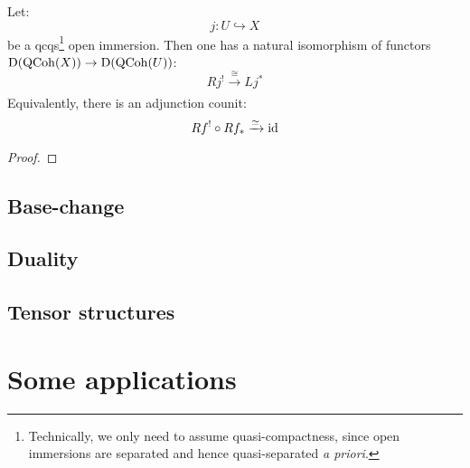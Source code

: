             \begin{theorem} \label{theorem: extending_qcoh_from_qc_open_subschemes}
                Let:
                    $$j: U \hookrightarrow X$$
                be a qcqs\footnote{Technically, we only need to assume quasi-compactness, since open immersions are separated and hence quasi-separated \textit{a priori}.} open immersion. Then one has a natural isomorphism of functors $\mathrm{D}(\mathrm{QCoh}(X)) \to \mathrm{D}(\mathrm{QCoh}(U))$:
                    $$Rj^! \xrightarrow[]{\cong} Lj^*$$
                Equivalently, there is an adjunction counit:
                    $$Rf^! \circ Rf_* \xrightarrow[]{\simeq} \mathrm{id}$$
            \end{theorem}
                \begin{proof}
                    
                \end{proof}

        \subsection{Base-change}

        \subsection{Duality}

        \subsection{Tensor structures}

    \section{Some applications}
